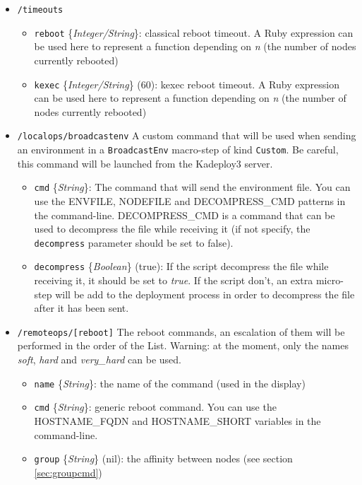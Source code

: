\documentclass[a4wide,10pt,oneside]{book}
\newcommand{\ypath}[1]{\texttt{#1}}
\newcommand{\yfield}[2]{\texttt{#1} {\small\{{\emph{#2}}\}}:}
\newcommand{\yfieldd}[3]{\texttt{#1} {\small\{{\emph{#2}}\}} {\small(}#3{\small)}:}
\begin{document}
\begin{itemize}
  \item \ypath{/timeouts}
  \begin{itemize}
    \item \yfield{reboot}{Integer/String} classical reboot timeout. A Ruby expression can be used here to represent a function depending on \emph{n} (the number of nodes currently rebooted)
    \item \yfieldd{kexec}{Integer/String}{60} kexec reboot timeout. A Ruby expression can be used here to represent a function depending on \emph{n} (the number of nodes currently rebooted)
  \end{itemize}
  \item \ypath{/localops/broadcastenv} A custom command that will be used when sending an environment in a \texttt{BroadcastEnv} macro-step of kind \texttt{Custom}. Be careful, this command will be launched from the Kadeploy3 server.
  \begin{itemize}
    \item \yfield{cmd}{String} The command that will send the environment file. You can use the ENVFILE, NODEFILE and DECOMPRESS\_CMD patterns in the command-line. DECOMPRESS\_CMD is a command that can be used to decompress the file while receiving it (if not specify, the \texttt{decompress} parameter should be set to false).
    \item \yfieldd{decompress}{Boolean}{true} If the script decompress the file while receiving it, it should be set to \emph{true}. If the script don't, an extra micro-step will be add to the deployment process in order to decompress the file after it has been sent.
  \end{itemize}
  \item \ypath{/remoteops/[reboot]} The reboot commands, an escalation of them will be performed in the order of the List. Warning: at the moment, only the names \emph{soft}, \emph{hard} and \emph{very\_hard} can be used.
  \begin{itemize}
    \item \yfield{name}{String} the name of the command (used in the display)
    \item \yfield{cmd}{String} generic reboot command. You can use the HOSTNAME\_FQDN and HOSTNAME\_SHORT variables in the command-line.
    \item \yfieldd{group}{String}{nil} the affinity between nodes (see section \ref{sec:groupcmd})
  \end{itemize}


\end{itemize}
\end{document}
